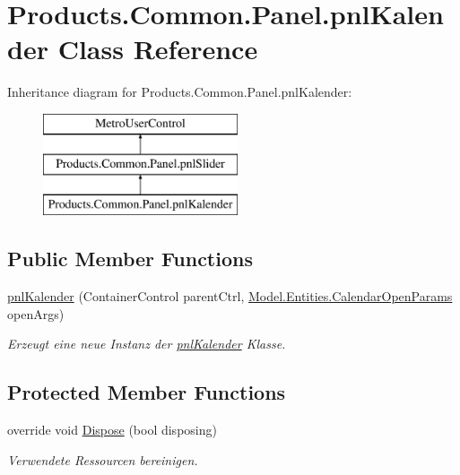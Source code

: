 \hypertarget{class_products_1_1_common_1_1_panel_1_1pnl_kalender}{}\section{Products.\+Common.\+Panel.\+pnl\+Kalender Class Reference}
\label{class_products_1_1_common_1_1_panel_1_1pnl_kalender}
Inheritance diagram for Products.\+Common.\+Panel.\+pnl\+Kalender\+:\begin{figure}[H]
\begin{center}
\leavevmode
\includegraphics[height=3.000000cm]{class_products_1_1_common_1_1_panel_1_1pnl_kalender}
\end{center}
\end{figure}
\subsection*{Public Member Functions}
\begin{DoxyCompactItemize}
\item 
\hyperlink{class_products_1_1_common_1_1_panel_1_1pnl_kalender_adb3d6ec2cfc1d443a79a82536cddb882}{pnl\+Kalender} (Container\+Control parent\+Ctrl, \hyperlink{class_products_1_1_model_1_1_entities_1_1_calendar_open_params}{Model.\+Entities.\+Calendar\+Open\+Params} open\+Args)
\begin{DoxyCompactList}\small\item\em Erzeugt eine neue Instanz der \hyperlink{class_products_1_1_common_1_1_panel_1_1pnl_kalender}{pnl\+Kalender} Klasse. \end{DoxyCompactList}\end{DoxyCompactItemize}
\subsection*{Protected Member Functions}
\begin{DoxyCompactItemize}
\item 
override void \hyperlink{class_products_1_1_common_1_1_panel_1_1pnl_kalender_aaf7d5181ec9e30d39a22adaecbf3f736}{Dispose} (bool disposing)
\begin{DoxyCompactList}\small\item\em Verwendete Ressourcen bereinigen. \end{DoxyCompactList}\end{DoxyCompactItemize}
